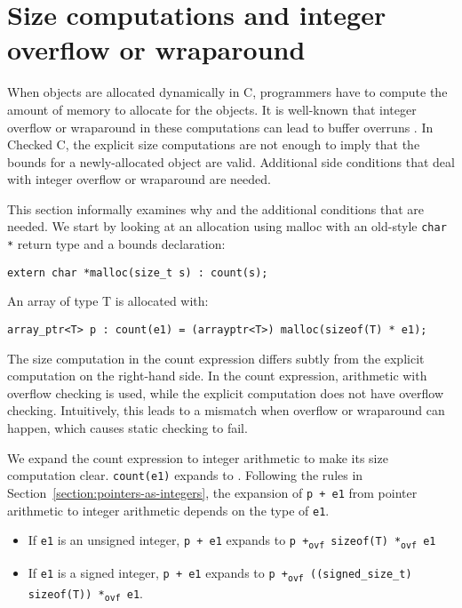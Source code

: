 \section{Size computations and integer overflow or wraparound}
\label{section:integer-overflow-informal}

When objects are allocated dynamically in C, programmers have to compute
the amount of memory to allocate for the objects. It is well-known 
that integer overflow or wraparound in these computations can lead to buffer
overruns \cite{Howard2003,Mitre2015-128,Mitre2015-190,Mitre2015-680,Dietz2015}.
 In Checked C, the explicit size computations are not enough
to imply that the bounds for a newly-allocated object are valid.
Additional side conditions that deal with integer overflow or wraparound
are needed.

This section informally examines why and the additional conditions that
are needed. We start by looking at an allocation using malloc with an
old-style \texttt{char *} return type and a bounds declaration:

\begin{lstlisting}
extern char *malloc(size_t s) : count(s);
\end{lstlisting}

An array of type T is allocated with:

\begin{lstlisting}
array_ptr<T> p : count(e1) = (arrayptr<T>) malloc(sizeof(T) * e1);
\end{lstlisting}

The size computation in the count expression differs subtly from the
explicit computation on the right-hand side. In the count expression,
arithmetic with overflow checking is used, while the explicit
computation does not have overflow checking. Intuitively, this leads to
a mismatch when overflow or wraparound can happen, which causes static
checking to fail.

We expand the count expression to integer arithmetic to make its size
computation clear. \texttt{count(e1)} expands to . 
Following the rules in Section~\ref{section:pointers-as-integers},
the expansion of \texttt{p +
e1} from pointer arithmetic to integer arithmetic depends on the type of
\texttt{e1}.

\begin{itemize}
\item
  If \texttt{e1} is an unsigned integer, \texttt{p + e1} expands to
  \texttt{p +\textsubscript{ovf} sizeof(T) *\textsubscript{ovf} e1}
\item
  If \texttt{e1} is a signed integer, \texttt{p + e1} expands to
  \texttt{p +\textsubscript{ovf} ((signed\_size\_t) sizeof(T))
  *\textsubscript{ovf} e1}.
\end{itemize}

